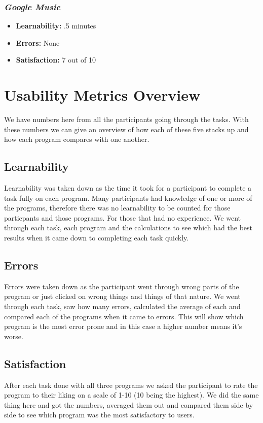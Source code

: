 \documentclass{article}
\begin{document}
{\begin{multicols}{2}
\subsubsection{\it Google Music}
\begin{itemize}
\item {\bf Learnability:} .5 minutes
	\item {\bf Errors:} None
	\item {\bf Satisfaction:} 7 out of 10 
\end{itemize}
\end{multicols}

\section{Usability Metrics Overview}
We have numbers here from all the participants going through the tasks. With these numbers we can give an overview of how each of these five stacks up and how each program compares with one another.

\subsection{Learnability}
Learnability was taken down as the time it took for a participant to complete a task fully on each program. Many participants had knowledge of one or more of the programs, therefore there was no learnability to be counted for those particpants and those programs. For those that had no experience. We went through each task, each program and the calculations to see which had the best results when it came down to completing each task quickly.

\subsection{Errors}
Errors were taken down as the participant went through wrong parts of the program or just clicked on wrong things and things of that nature. We went through each task, saw how many errors, calculated the average of each and compared each of the programs when it came to errors. This will show which program is the most error prone and in this case a higher number means it's worse.

\subsection{Satisfaction}
After each task done with all three programs we asked the participant to rate the program to their liking on a scale of 1-10 (10 being the highest). We did the same thing here and got the numbers, averaged them out and compared them side by side to see which program was the most satisfactory to users.

}
\end{document}
